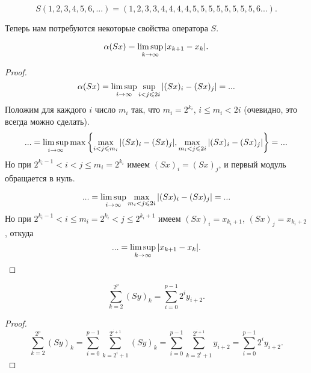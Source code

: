 \begin{example}
	$$
		S(1,2,3,4,5,6, ...) = (1,2,3,3,4,4,4,4,5,5,5,5,5,5,5,5,6...)
		.
	$$
\end{example}

Теперь нам потребуются некоторые свойства оператора $S$.

\begin{lemma}
	\label{thm:alpha_S}
	\begin{equation}\label{alpha_S}
		\alpha(Sx) = \varlimsup_{k\to\infty} |x_{k+1} - x_{k}|
		.
	\end{equation}
\end{lemma}

\begin{proof}
	\begin{equation*}
		\alpha(Sx) =
		\varlimsup_{i\to\infty} \sup_{i < j \leq 2i} | (Sx)_i - (Sx)_j | = ...
	\end{equation*}
	Положим для каждого $i$ число $m_i$ так,
	что $m_i = 2^{k_i}$, $i \leq m_i < 2i$
	(очевидно, это всегда можно сделать).
	\begin{equation*}
		... =
		\varlimsup_{i\to\infty} \max \left\{
			\max_{i   < j \leq m_i} | (Sx)_i - (Sx)_j |,
			\max_{m_i < j \leq 2i } | (Sx)_i - (Sx)_j |
		\right\} =
		...
	\end{equation*}
	Но при $2^{k_i - 1} < i < j \leq m_i = 2^{k_i}$
	имеем $(Sx)_i = (Sx)_j$, и первый модуль обращается в нуль.

	\begin{equation*}
		... =
		\varlimsup_{i\to\infty}
			\max_{m_i < j \leq 2i } | (Sx)_i - (Sx)_j |
		=
		...
	\end{equation*}
	Но при $2^{k_i - 1} < i \leq m_i = 2^{k_i} < j \leq 2^{k_i+1}$
	имеем $(Sx)_i = x_{k_i+1}$, $(Sx)_j = x_{k_i+2}$, откуда
	\begin{equation}\label{alpha_S_sosedi}
		... =
		\varlimsup_{k\to\infty}
			| x_{k+1} - x_k |
			.
	\end{equation}
\end{proof}


\begin{lemma}
	\begin{equation}\label{summa_S_less}
		\sum_{k=2}^{2^p} (Sy)_k =
		\sum_{i=0}^{p-1} 2^i y_{i+2}
		.
	\end{equation}
\end{lemma}

\begin{proof}
	\begin{equation*}
		\sum_{k=2}^{2^p} (Sy)_k =
		\sum_{i=0}^{p-1} \sum_{k=2^i+1}^{2^{i+1}} (Sy)_k =
		\sum_{i=0}^{p-1} \sum_{k=2^i+1}^{2^{i+1}} y_{i+2} =
		\sum_{i=0}^{p-1} 2^i y_{i+2}
		.
	\end{equation*}
\end{proof}



